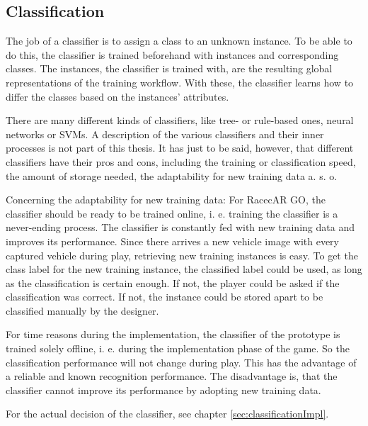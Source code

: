 \subsection{Classification}\label{sec:classificationConcept}
The job of a classifier is to assign a class to an unknown instance. To be able to do this, the classifier is trained beforehand with instances and corresponding classes. The instances, the classifier is trained with, are the resulting global representations of the training workflow. With these, the classifier learns how to differ the classes based on the instances' attributes.

There are many different kinds of classifiers, like tree- or rule-based ones, neural networks or SVMs. A description of the various classifiers and their inner processes is not part of this thesis. It has just to be said, however, that different classifiers have their pros and cons, including the training or classification speed, the amount of storage needed, the adaptability for new training data a. s. o.

Concerning the adaptability for new training data: For RacecAR GO, the classifier should be ready to be trained online, i. e. training the classifier is a never-ending process. The classifier is constantly fed with new training data and improves its performance. Since there arrives a new vehicle image with every captured vehicle during play, retrieving new training instances is easy. To get the class label for the new training instance, the classified label could be used, as long as the classification is certain enough. If not, the player could be asked if the classification was correct. If not, the instance could be stored apart to be classified manually by the designer.

For time reasons during the implementation, the classifier of the prototype is trained solely offline, i. e. during the implementation phase of the game. So the classification performance will not change during play. This has the advantage of a reliable and known recognition performance. The disadvantage is, that the classifier cannot improve its performance by adopting new training data.

For the actual decision of the classifier, see chapter \ref{sec:classificationImpl}.

